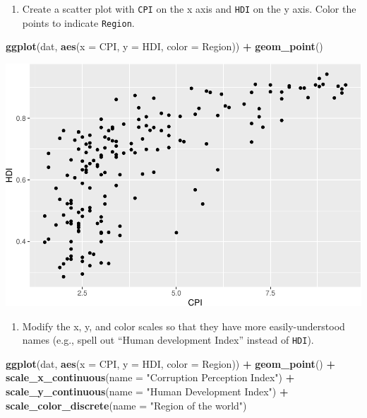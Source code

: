 \documentclass[
]{book}
\newenvironment{Shaded}{\begin{snugshade}}{\end{snugshade}}
\newcommand{\DataTypeTok}[1]{\textcolor[rgb]{0.13,0.29,0.53}{#1}}
\newcommand{\KeywordTok}[1]{\textcolor[rgb]{0.13,0.29,0.53}{\textbf{#1}}}
\newcommand{\NormalTok}[1]{#1}
\newcommand{\OperatorTok}[1]{\textcolor[rgb]{0.81,0.36,0.00}{\textbf{#1}}}
\newcommand{\StringTok}[1]{\textcolor[rgb]{0.31,0.60,0.02}{#1}}
\providecommand{\tightlist}{%
  \setlength{\itemsep}{0pt}\setlength{\parskip}{0pt}}
\begin{document}
\begin{alert}

\begin{enumerate}
\def\labelenumi{\arabic{enumi}.}
\tightlist
\item
  Create a scatter plot with \texttt{CPI} on the x axis and \texttt{HDI} on the y axis. Color the points to indicate \texttt{Region}.
\end{enumerate}

\begin{Shaded}
\begin{Highlighting}[]
\KeywordTok{ggplot}\NormalTok{(dat, }\KeywordTok{aes}\NormalTok{(}\DataTypeTok{x =}\NormalTok{ CPI, }\DataTypeTok{y =}\NormalTok{ HDI, }\DataTypeTok{color =}\NormalTok{ Region)) }\OperatorTok{+}
\StringTok{  }\KeywordTok{geom\_point}\NormalTok{()}
\end{Highlighting}
\end{Shaded}

\includegraphics{R/Rgraphics/figures/unnamed-chunk-202-1.pdf}

\begin{enumerate}
\def\labelenumi{\arabic{enumi}.}
\setcounter{enumi}{1}
\tightlist
\item
  Modify the x, y, and color scales so that they have more easily-understood names (e.g., spell out ``Human development Index'' instead of \texttt{HDI}).
\end{enumerate}

\begin{Shaded}
\begin{Highlighting}[]
\KeywordTok{ggplot}\NormalTok{(dat, }\KeywordTok{aes}\NormalTok{(}\DataTypeTok{x =}\NormalTok{ CPI, }\DataTypeTok{y =}\NormalTok{ HDI, }\DataTypeTok{color =}\NormalTok{ Region)) }\OperatorTok{+}
\StringTok{  }\KeywordTok{geom\_point}\NormalTok{() }\OperatorTok{+}
\StringTok{  }\KeywordTok{scale\_x\_continuous}\NormalTok{(}\DataTypeTok{name =} \StringTok{"Corruption Perception Index"}\NormalTok{) }\OperatorTok{+}
\StringTok{  }\KeywordTok{scale\_y\_continuous}\NormalTok{(}\DataTypeTok{name =} \StringTok{"Human Development Index"}\NormalTok{) }\OperatorTok{+}
\StringTok{  }\KeywordTok{scale\_color\_discrete}\NormalTok{(}\DataTypeTok{name =} \StringTok{"Region of the world"}\NormalTok{)}
\end{Highlighting}
\end{Shaded}


\end{alert}
\end{document}
